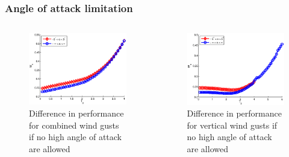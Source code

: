 \documentclass[compress]{beamer}
\begin{document}
\begin{frame}
  \frametitle{Angle of attack limitation}
  \begin{columns}
    \begin{figure}[h]
      \centering
      \includegraphics[width=1\textwidth]{./Figures/allowed_alpha_wg_tg_wt=3.eps}
      \caption{Difference in performance for combined wind gusts if no high angle of attack are allowed}
      \label{fig:allowed_alpha_Wt_vs_tg_wt=3}
    \end{figure}

    \begin{figure}[h]
      \centering
      \includegraphics[width=1\textwidth]{./Figures/allowed_alpha_wg_tg_wt=1.eps}
      \caption{Difference in performance for vertical wind gusts if no high angle of attack are allowed}
      \label{fig:allowed_alpha_Wt_vs_tg_wt=1}
    \end{figure}
  \end{columns}
\end{frame}
\end{document}
